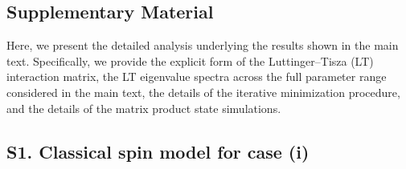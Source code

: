 \documentclass[aps,prl,twocolumn,showpacs,superscriptaddress]{revtex4-2}
\begin{document}
\renewcommand{\thefigure}{S\arabic{figure}}
\setcounter{figure}{0}
\renewcommand{\theequation}{S\arabic{equation}}
\setcounter{equation}{0}
\renewcommand{\thetable}{S\arabic{table}}
\setcounter{table}{0}

\begin{widetext}
\section{Supplementary Material}

Here, we present the detailed analysis underlying the results shown in the main text. Specifically, we provide the explicit form of the Luttinger–Tisza (LT) interaction matrix, the LT eigenvalue spectra across the full parameter range considered in the main text, the details of the iterative minimization procedure, and the details of the matrix product state simulations.
\subsection{S1. Classical spin model for case (i)}

\end{widetext}
\end{document}
